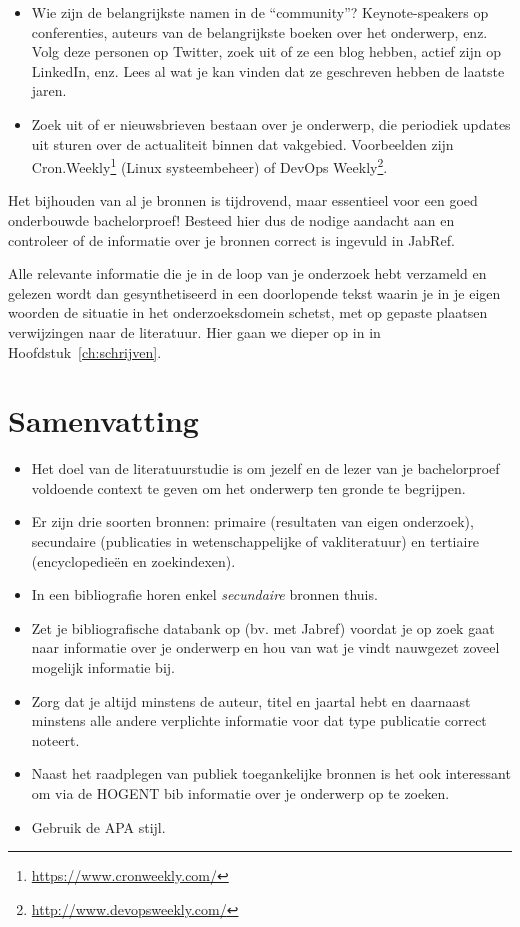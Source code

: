 \begin{itemize}
  \item Wie zijn de belangrijkste namen in de ``community''? Keynote-speakers op conferenties, auteurs van de belangrijkste boeken over het onderwerp, enz. Volg deze personen op Twitter, zoek uit of ze een blog hebben, actief zijn op LinkedIn, enz. Lees al wat je kan vinden dat ze geschreven hebben de laatste jaren.
  
  \item Zoek uit of er nieuwsbrieven bestaan over je onderwerp, die periodiek updates uit sturen over de actualiteit binnen dat vakgebied. Voorbeelden zijn Cron.Weekly\footnote{\url{https://www.cronweekly.com/}} (Linux systeembeheer) of DevOps Weekly\footnote{\url{http://www.devopsweekly.com/}}.
\end{itemize}

Het bijhouden van al je bronnen is tijdrovend, maar essentieel voor een goed onderbouwde bachelorproef! Besteed hier dus de nodige aandacht aan en controleer of de informatie over je bronnen correct is ingevuld in JabRef.

Alle relevante informatie die je in de loop van je onderzoek hebt verzameld en gelezen wordt dan gesynthetiseerd in een doorlopende tekst waarin je in je eigen woorden de situatie in het onderzoeksdomein schetst, met op gepaste plaatsen verwijzingen naar de literatuur. Hier gaan we dieper op in in Hoofdstuk~\ref{ch:schrijven}.

\section{Samenvatting}
\label{sec:literatuuronderzoek_samenvatting}

\begin{itemize}
  \item Het doel van de literatuurstudie is om jezelf en de lezer van je bachelorproef voldoende context te geven om het onderwerp ten gronde te begrijpen.
  \item Er zijn drie soorten bronnen: primaire (resultaten van eigen onderzoek), secundaire (publicaties in wetenschappelijke of vakliteratuur) en tertiaire (encyclopedieën en zoekindexen).
  \item In een bibliografie horen enkel \emph{secundaire} bronnen thuis.
  \item Zet je bibliografische databank op (bv. met Jabref) voordat je op zoek gaat naar informatie over je onderwerp en hou van wat je vindt nauwgezet zoveel mogelijk informatie bij.
  \item Zorg dat je altijd minstens de auteur, titel en jaartal hebt en daarnaast minstens alle andere verplichte informatie voor dat type publicatie correct noteert.
  \item Naast het raadplegen van publiek toegankelijke bronnen is het ook interessant om via de HOGENT bib informatie over je onderwerp op te zoeken.
  \item Gebruik de APA stijl.
\end{itemize}


